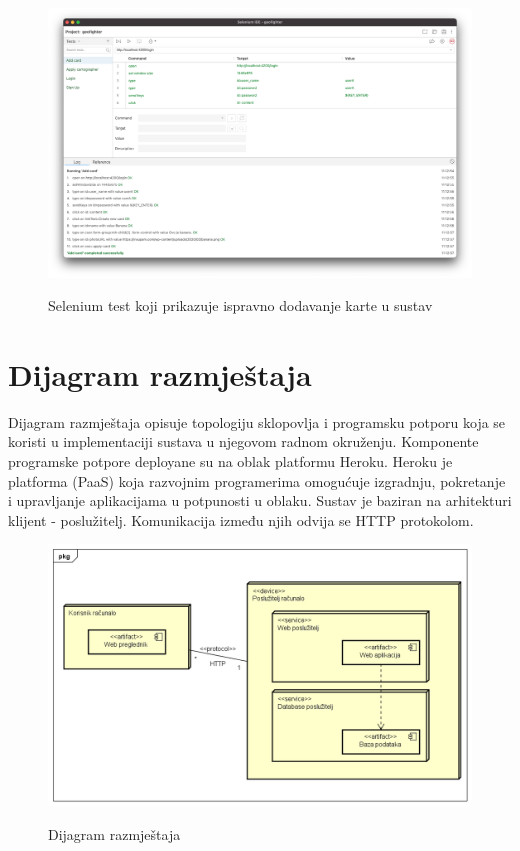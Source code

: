 			\begin{figure}[H]
				\centering
				\includegraphics[scale=0.27]{dokumentacija/slike/SeleniumCardSuccess.png} \\
				\caption{ Selenium test koji prikazuje ispravno dodavanje karte u sustav}
				\label{fig:SeleniumCartographerSuccess}
			\end{figure}

		    \eject
		
		
		\section{Dijagram razmještaja}
			
			 \textnormal{Dijagram razmještaja opisuje topologiju sklopovlja i programsku potporu koja se koristi u implementaciji sustava u njegovom radnom okruženju. Komponente programske potpore deployane su na oblak platformu Heroku. Heroku je platforma (PaaS) koja razvojnim programerima omogućuje izgradnju, pokretanje i upravljanje aplikacijama u potpunosti u oblaku. Sustav je baziran na arhitekturi klijent - poslužitelj. Komunikacija između njih odvija se HTTP protokolom.}
			
			
			\begin{figure}[H]
				\centering
				\includegraphics[scale=0.58]{dijagrami/Deployment Diagram0} \\
				\caption{Dijagram razmještaja}
				\label{fig:UC8_sekvencijski}
			\end{figure}
		
